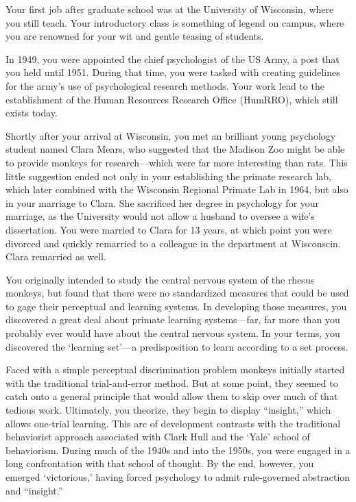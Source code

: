 \begin{refsection}
Your first job after graduate school was at the University of Wisconsin, where you still teach. Your introductory class is something of legend on campus, where you are renowned for your wit and gentle teasing of students.

In 1949, you were appointed the chief psychologist of the US Army, a post that you held until 1951. During that time, you were tasked with creating guidelines for the army's use of psychological research methods. Your work lead to the establishment of the Human Resources Research Office (HumRRO), which still exists today.

Shortly after your arrival at Wisconsin, you met an brilliant young psychology student named Clara Mears, who suggested that the Madison Zoo might be able to provide monkeys for research---which were far more interesting than rats. This little suggestion ended not only in your establishing the primate research lab, which later combined with the Wisconsin Regional Primate Lab in 1964, but also in your marriage to Clara. She sacrificed her degree in psychology for your marriage, as the University would not allow a husband to oversee a wife's dissertation. You were married to Clara for 13 years, at which point you were divorced and quickly remarried to a colleague in the department at Wisconscin. Clara remarried as well.

You originally intended to study the central nervous system of the rhesus monkeys, but found that there were no standardized measures that could be used to gage their perceptual and learning systems. In developing those measures, you discovered a great deal about primate learning systems---far, far more than you probably ever would have about the central nervous system. In your terms, you discovered the `learning set'---a predisposition to learn according to a set process.

Faced with a simple perceptual discrimination problem monkeys initially started with the traditional trial-and-error method. But at some point, they seemed to catch onto a general principle that would allow them to skip over much of that tedious work. Ultimately, you theorize, they begin to display ``insight,'' which allows one-trial learning. This arc of development contrasts with the traditional behaviorist approach associated with Clark Hull and the `Yale' school of behaviorism. During much of the 1940s and into the 1950s, you were engaged in a long confrontation with that school of thought. By the end, however, you emerged `victorious,' having forced psychology to admit rule-governed abstraction and ``insight.''


\end{refsection}
